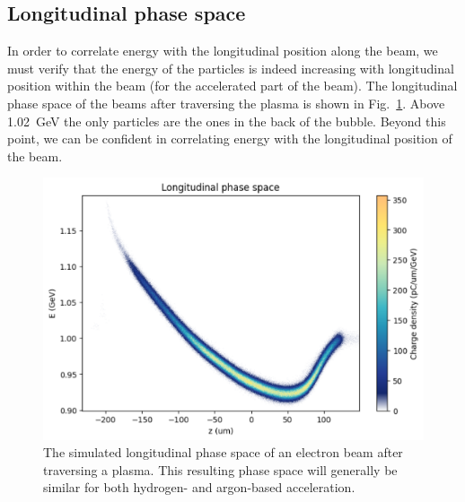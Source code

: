 \documentclass[a4paper,
               biblatex,     %
               ]{jacow}
\begin{document}
\subsection{Longitudinal phase space}
In order to correlate energy with the longitudinal position along the beam, we must verify that the energy of the particles is indeed increasing with longitudinal position within the beam (for the accelerated part of the beam). The longitudinal phase space of the beams after traversing the plasma is shown in Fig.~\ref{fig:lps}. Above \SI{1.02}{GeV} the only particles are the ones in the back of the bubble. Beyond this point, we can be confident in correlating energy with the longitudinal position of the beam.
\begin{figure}[!tbh]
    \centering
    \includegraphics[width=1\linewidth]{TUPS013_f2.pdf}
    \caption{The simulated longitudinal phase space of an electron beam after traversing a plasma. This resulting phase space will generally be similar for both hydrogen- and argon-based acceleration.}
    \label{fig:lps}
\end{figure}
\end{document}
